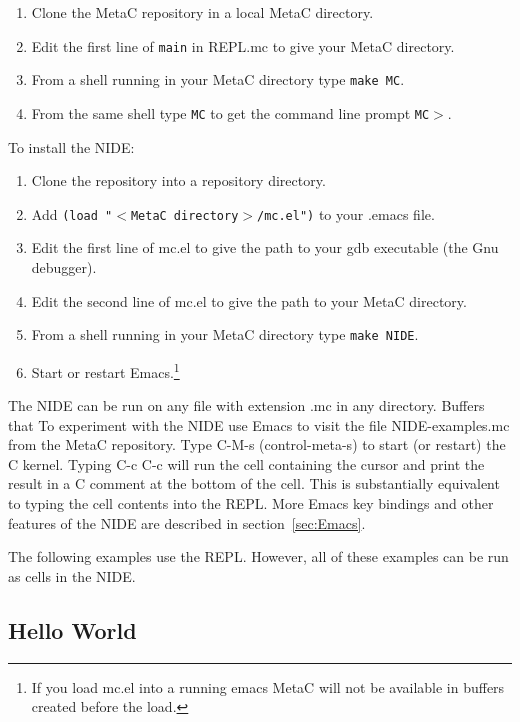 \documentclass{article}
\begin{document}
\begin{enumerate}
\item Clone the MetaC repository in a local MetaC directory.
\item Edit the first line of {\tt main} in REPL.mc to give your MetaC directory.
\item From a shell running in your MetaC directory type {\tt make MC}.
\item From the same shell type {\tt MC} to get the command line prompt {\tt MC$>$}.
\end{enumerate}

\noindent To install the NIDE:

\begin{enumerate}
\item Clone the repository into a repository directory.
\item Add {\tt (load "$<$MetaC directory$>$/mc.el")} to your .emacs file.
\item Edit the first line of  mc.el to give the path to your gdb executable (the Gnu debugger).
\item Edit the second line of mc.el to give the path to your MetaC directory.
\item From a shell running in your MetaC directory type {\tt make NIDE}.
\item Start or restart Emacs.\footnote{If you load mc.el into a running emacs
MetaC will not be available in buffers created before the load.}
  
\end{enumerate}

\noindent The NIDE can be run on any file with extension .mc in any
directory. Buffers that 
To experiment with the NIDE use Emacs to visit the file
NIDE-examples.mc from the MetaC repository.  Type C-M-s
(control-meta-s) to start (or restart) the C kernel. Typing C-c C-c
will run the cell containing the cursor and print the result in a C
comment at the bottom of the cell.  This is substantially equivalent
to typing the cell contents into the REPL.  More Emacs key bindings
and other features of the NIDE are described in
section~\ref{sec:Emacs}.

\medskip
\noindent The following examples use the REPL.  However, all of these examples can be run as cells in the NIDE.

\subsection{Hello World}
\label{sec:hello}
\end{document}
